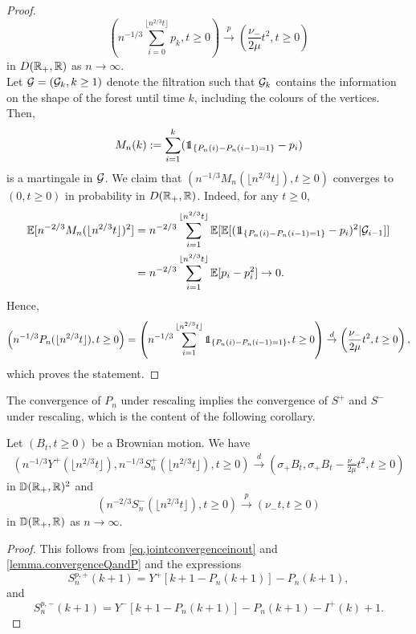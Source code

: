 \begin{proof}
$$\left(n^{-1/3}\sum_{i=0}^{\lfloor n^{2/3}t \rfloor} p_k , t \geq 0\right)\overset{p}{\to} \left(\frac{\nu_-}{2\mu}t^2,t\geq 0\right)$$
in $D({\mathbb R}_+,{\mathbb R})$ as $n\to \infty$. \\
Let ${\mathcal G}=({\mathcal G}_k,k\geq 1)$ denote the filtration such that ${\mathcal G}_{k}$ contains the information on the shape of the forest until time $k$, including the colours of the vertices. Then, 
$$M_n(k):=\sum_{i=1}^k (\one_{\{P_n(i)-P_n(i-1)=1\}}-p_i)$$ is a martingale in ${\mathcal G}$. We claim that $(n^{-1/3}M_n(\lfloor n^{2/3} t\rfloor ), t\geq 0)$ converges to $(0,t\geq 0)$ in probability in $D({\mathbb R}_+,{\mathbb R})$. Indeed, for any $t\geq 0$,
\begin{align*}\E[n^{-2/3}M_n(\lfloor n^{2/3} t\rfloor )^2]&=n^{-2/3}\sum_{i=1}^{\lfloor n^{2/3} t\rfloor} \E[\E[(\one_{\{P_n(i)-P_n(i-1)=1\}}-p_i)^2|\cG_{i-1}]]\\&=n^{-2/3}\sum_{i=1}^{\lfloor n^{2/3} t\rfloor} \E[p_i-p_i^2]\to 0.\end{align*}
Hence,
$$\left(n^{-1/3}P_n(\lfloor n^{2/3}t\rfloor), t\geq 0\right)=\left(n^{-1/3}\sum_{i=1}^{\lfloor n^{2/3}t\rfloor}  \one_{\{P_n(i)-P_n(i-1)=1\}}  , t\geq 0\right)\overset{d}{\to} \left( \frac{\nu_-}{2\mu}t^2, t\geq 0 \right),$$
 which proves the statement.

\end{proof}

The convergence of $P_n$ under rescaling implies the convergence of $S^{+}$ and $S^{-}$ under rescaling, which is the content of the following corollary. 

\begin{corollary}\label{cor.lukasiewiczpathpurplevertices}
 Let $(B_t,t\geq 0)$ be a Brownian motion. We have 
 \begin{align*}\left(n^{-1/3}Y^{+}\left(\lfloor n^{2/3}t\rfloor\right), n^{-1/3}S^{+}_n\left(\lfloor n^{2/3}t\rfloor\right), t\geq 0\right)\overset{d}{\to}\left(\sigma_+B_t,\sigma_+B_t-\frac{\nu_-}{2\mu}t^2,  t\geq 0\right)\end{align*}
 in ${\mathbb D}({\mathbb R}_+,{\mathbb R})^2$  and 
 $$\left(n^{-2/3}S^{-}_n\left(\lfloor n^{2/3}t\rfloor\right),t\geq 0\right)\overset{p}{\to}\left(\nu_- t,t\geq 0\right)$$
 in ${\mathbb D}({\mathbb R}_+,{\mathbb R})$ as $n\to\infty$.
\end{corollary}
\begin{proof}
 This follows from \eqref{eq.jointconvergenceinout} and \ref{lemma.convergenceQandP} and the expressions 
 $$S_n^{p,+}(k+1)=Y^+\left[k+1-P_n(k+1)\right]-P_n(k+1),$$ and $$S_n^{p,-}(k+1)=Y^-\left[k+1-P_n(k+1)\right]-P_n(k+1)-I^{+}(k)+1.$$
\end{proof}

